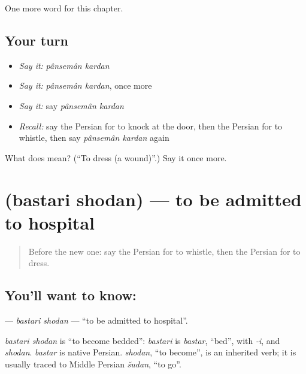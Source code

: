 \begin{grammarlens}[title={What you've built}]
One more word for this chapter.
\end{grammarlens}

\subsection*{Your turn}
\begin{itemize}
\raggedright
  \item \emph{Say it:} \emph{pânsemân kardan}
  \item \emph{Say it:} \emph{pânsemân kardan}, once more
  \item \emph{Say it:} say \emph{pânsemân kardan}
  \item \emph{Recall:} say the Persian for to knock at the door, then the Persian for to whistle, then say \emph{pânsemân kardan} again
\end{itemize}

\begin{tcolorbox}[breakable,colback=teal!4,colframe=teal!35!black,title={Before you move on}]
What does   mean? (\textquotedblleft{}To dress (a wound)\textquotedblright{}.) Say it once more.
\end{tcolorbox}
\section[\texorpdfstring{\fa{بستری} \fa{شدن} (bastari shodan)}{بستری شدن (bastari shodan)}]{  (bastari shodan) — to be admitted to hospital}

\label{lesson:FA-C261-bastari-shodan}



\begin{quote}
Before the new one: say the Persian for to whistle, then the Persian for to dress.
\end{quote}

\subsection*{You'll want to know:  }
\textbf{ } — \emph{bastari shodan} — \textquotedblleft{}to be admitted to hospital\textquotedblright{}.

\begin{cousinweb}
\emph{bastari shodan} is \textquotedblleft{}to become bedded\textquotedblright{}: \emph{bastari} is \emph{bastar}, \textquotedblleft{}bed\textquotedblright{}, with \emph{-i}, and \emph{shodan}. \emph{bastar} is native Persian. \emph{shodan}, \textquotedblleft{}to become\textquotedblright{}, is an inherited verb; it is usually traced to Middle Persian \emph{šudan}, \textquotedblleft{}to go\textquotedblright{}.
\end{cousinweb}

